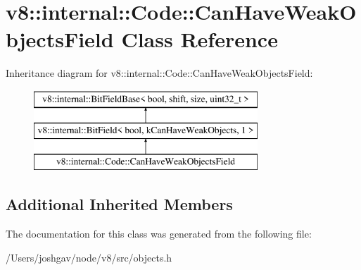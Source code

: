 \hypertarget{classv8_1_1internal_1_1_code_1_1_can_have_weak_objects_field}{}\section{v8\+:\+:internal\+:\+:Code\+:\+:Can\+Have\+Weak\+Objects\+Field Class Reference}
\label{classv8_1_1internal_1_1_code_1_1_can_have_weak_objects_field}
Inheritance diagram for v8\+:\+:internal\+:\+:Code\+:\+:Can\+Have\+Weak\+Objects\+Field\+:\begin{figure}[H]
\begin{center}
\leavevmode
\includegraphics[height=3.000000cm]{classv8_1_1internal_1_1_code_1_1_can_have_weak_objects_field}
\end{center}
\end{figure}
\subsection*{Additional Inherited Members}


The documentation for this class was generated from the following file\+:\begin{DoxyCompactItemize}
\item 
/\+Users/joshgav/node/v8/src/objects.\+h\end{DoxyCompactItemize}
